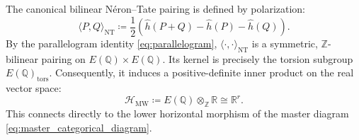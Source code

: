 \documentclass[11pt,reqno]{article}
\theoremstyle{plain}
\theoremstyle{definition}
\begin{document}
The canonical bilinear Néron--Tate pairing is defined by polarization:
\begin{equation}
    \label{eq:neron_tate_pairing}
    \langle P, Q \rangle_{\mathrm{NT}} \coloneqq \frac{1}{2} \left( \hat{h}(P + Q) - \hat{h}(P) - \hat{h}(Q) \right).
\end{equation}
By the parallelogram identity \eqref{eq:parallelogram}, $\langle \cdot, \cdot \rangle_{\mathrm{NT}}$ is a symmetric, $\mathbb{Z}$-bilinear pairing on $E(\mathbb{Q}) \times E(\mathbb{Q})$. Its kernel is precisely the torsion subgroup $E(\mathbb{Q})_{\mathrm{tors}}$. Consequently, it induces a positive-definite inner product on the real vector space:
\begin{equation}
    \mathcal{H}_{\mathrm{MW}} \coloneqq E(\mathbb{Q}) \otimes_{\mathbb{Z}} \mathbb{R} \cong \mathbb{R}^r.
\end{equation}
This connects directly to the lower horizontal morphism of the master diagram \eqref{eq:master_categorical_diagram}.
\end{document}
